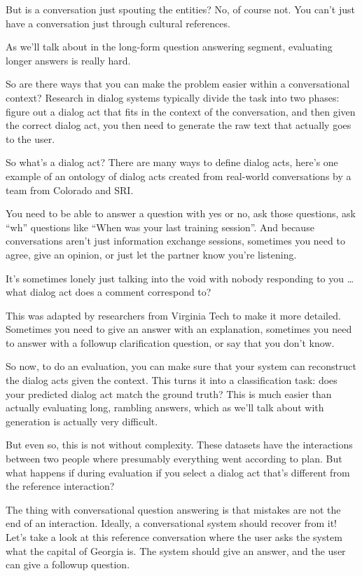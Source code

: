 But is a conversation just spouting the entities?  No, of course not.  You can’t just have a conversation just through cultural references.  

As we’ll talk about in the long-form question answering segment, evaluating longer answers is really hard.  

So are there ways that you can make the problem easier within a conversational context?  Research in dialog systems typically divide the task into two phases: figure out a dialog act that fits in the context of the conversation, and then given the correct dialog act, you then need to generate the raw text that actually goes to the user. 

So what’s a dialog act?  There are many ways to define dialog acts, here’s one example of an ontology of dialog acts created from real-world conversations by a team from Colorado and SRI.  

You need to be able to answer a question with yes or no, ask those questions, ask “wh” questions like “When was your last training session”.  And because conversations aren’t just information exchange sessions, sometimes you need to agree, give an opinion, or just let the partner know you’re listening.  

It’s sometimes lonely just talking into the void with nobody responding to you … what dialog act does a comment correspond to?

This was adapted by researchers from Virginia Tech to make it more detailed.  Sometimes you need to give an answer with an explanation, sometimes you need to answer with a followup clarification question, or say that you don’t know.

So now, to do an evaluation, you can make sure that your system can reconstruct the dialog acts given the context.  This turns it into a classification task: does your predicted dialog act match the ground truth?  This is much easier than actually evaluating long, rambling answers, which as we’ll talk about with generation is actually very difficult.

But even so, this is not without complexity.  These datasets have the interactions between two people where presumably everything went according to plan.  But what happens if during evaluation if you select a dialog act that’s different from the reference interaction?

The thing with conversational question answering is that mistakes are not the end of an interaction.  Ideally, a conversational system should recover from it!  Let’s take a look at this reference conversation where the user asks the system what the capital of Georgia is. The system should give an answer, and the user can give a followup question.

